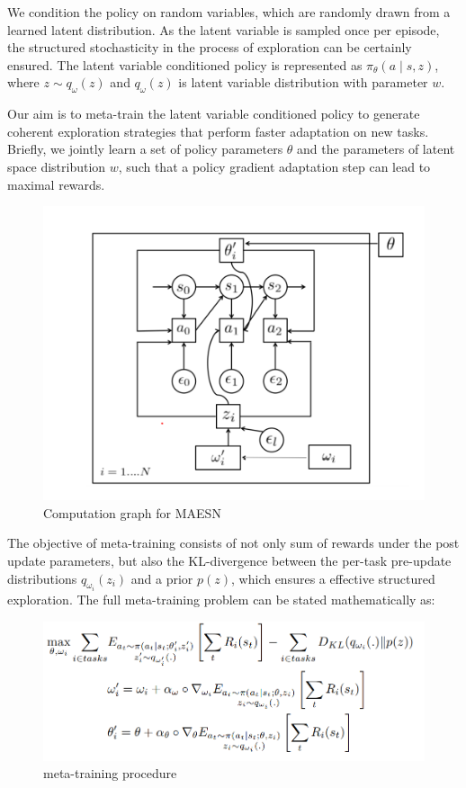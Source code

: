  We condition the policy on random variables, which are randomly drawn from a learned latent distribution. As the latent variable is sampled once per episode, the structured stochasticity in the process of exploration can be certainly ensured. The latent variable conditioned policy is represented as $\pi_{\theta}(a \mid s, z)$, where $z \sim q_{\omega}(z)$ and $q_{\omega}(z)$ is latent variable distribution with parameter $w$. 

Our aim is to meta-train the latent variable conditioned policy to generate coherent exploration strategies that perform faster adaptation on new tasks. Briefly, we jointly learn a set of policy parameters $\theta$ and the parameters of latent space distribution $w$, such that a policy gradient adaptation step can lead to maximal rewards.

\begin{figure}[H]
	\includegraphics[scale=0.7]{MAESN_02.PNG}
	\centering
	\caption{Computation graph for MAESN}
	\label{MAESN}
\end{figure}

The objective of meta-training consists of not only sum of rewards under the post update parameters, but also the KL-divergence between the per-task pre-update distributions $q_{\omega_{i}}\left(z_{i}\right)$ and a prior $p(z)$, which ensures a effective structured exploration.
The full meta-training problem can be stated mathematically as:

\begin{figure}[H]
	\includegraphics[scale=0.48]{MAESN_03.PNG}
	\centering
	\caption{meta-training procedure}
	\label{MAESN}
\end{figure}

